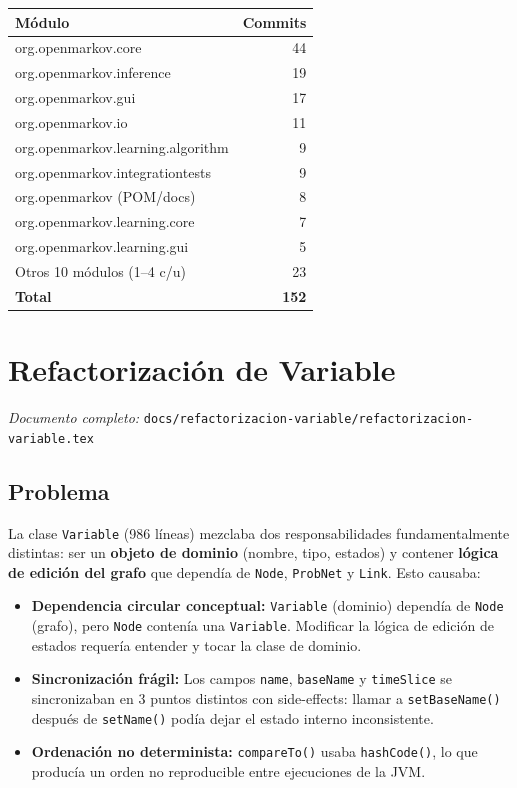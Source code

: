 \documentclass[11pt,a4paper]{article}
\begin{document}
\begin{center}
\begin{tabular}{lr}
\toprule
\textbf{Módulo} & \textbf{Commits} \\
\midrule
org.openmarkov.core         & 44 \\
org.openmarkov.inference    & 19 \\
org.openmarkov.gui          & 17 \\
org.openmarkov.io           & 11 \\
org.openmarkov.learning.algorithm & 9 \\
org.openmarkov.integrationtests   & 9 \\
org.openmarkov (POM/docs)   & 8 \\
org.openmarkov.learning.core & 7 \\
org.openmarkov.learning.gui  & 5 \\
Otros 10 módulos (1--4 c/u) & 23 \\
\midrule
\textbf{Total}              & \textbf{152} \\
\bottomrule
\end{tabular}
\end{center}

\section{Refactorización de Variable}
\label{sec:variable}

\noindent\textit{Documento completo:} \texttt{docs/refactorizacion-variable/refactorizacion-variable.tex}

\subsection{Problema}

La clase \texttt{Variable} (986 líneas) mezclaba dos responsabilidades fundamentalmente distintas: ser un \textbf{objeto de dominio} (nombre, tipo, estados) y contener \textbf{lógica de edición del grafo} que dependía de \texttt{Node}, \texttt{ProbNet} y \texttt{Link}. Esto causaba:

\begin{itemize}
  \item \textcolor{problem}{\textbf{Dependencia circular conceptual:}} \texttt{Variable} (dominio) dependía de \texttt{Node} (grafo), pero \texttt{Node} contenía una \texttt{Variable}. Modificar la lógica de edición de estados requería entender y tocar la clase de dominio.
  \item \textcolor{problem}{\textbf{Sincronización frágil:}} Los campos \texttt{name}, \texttt{baseName} y \texttt{timeSlice} se sincronizaban en 3 puntos distintos con side-effects: llamar a \texttt{setBaseName()} después de \texttt{setName()} podía dejar el estado interno inconsistente.
  \item \textcolor{problem}{\textbf{Ordenación no determinista:}} \texttt{compareTo()} usaba \texttt{hashCode()}, lo que producía un orden no reproducible entre ejecuciones de la JVM.
\end{itemize}
\end{document}
